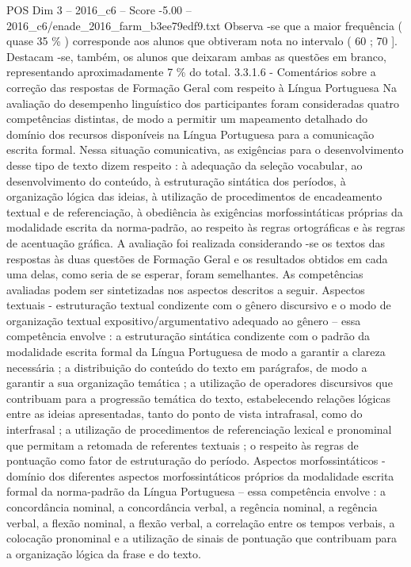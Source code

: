 \begin{textsample}{POS Dim 3 – 2016\_c6 – Score -5.00 – 2016\_c6/enade\_2016\_farm\_b3ee79edf9.txt}
Observa -se que a maior frequência ( quase 35 \% ) corresponde aos alunos que obtiveram nota no intervalo ( 60 ; 70 ].
Destacam -se, também, os alunos que deixaram ambas as questões em branco, representando aproximadamente 7 \% do total. 3.3.1.6 - Comentários sobre a correção das respostas de Formação Geral com respeito à Língua Portuguesa Na avaliação do desempenho linguístico dos participantes foram consideradas quatro competências distintas, de modo a permitir um mapeamento detalhado do domínio dos recursos disponíveis na Língua Portuguesa para a comunicação escrita formal.
Nessa situação comunicativa, as exigências para o desenvolvimento desse tipo de texto dizem respeito : à adequação da seleção vocabular, ao desenvolvimento do conteúdo, à estruturação sintática dos períodos, à organização lógica das ideias, à utilização de procedimentos de encadeamento textual e de referenciação, à obediência às exigências morfossintáticas próprias da modalidade escrita da norma-padrão, ao respeito às regras ortográficas e às regras de acentuação gráfica.
A avaliação foi realizada considerando -se os textos das respostas às duas questões de Formação Geral e os resultados obtidos em cada uma delas, como seria de se esperar, foram semelhantes.
As competências avaliadas podem ser sintetizadas nos aspectos descritos a seguir.
Aspectos textuais - estruturação textual condizente com o gênero discursivo e o modo de organização textual expositivo/argumentativo adequado ao gênero – essa competência envolve : a estruturação sintática condizente com o padrão da modalidade escrita formal da Língua Portuguesa de modo a garantir a clareza necessária ; a distribuição do conteúdo do texto em parágrafos, de modo a garantir a sua organização temática ; a utilização de operadores discursivos que contribuam para a progressão temática do texto, estabelecendo relações lógicas entre as ideias apresentadas, tanto do ponto de vista intrafrasal, como do interfrasal ; a utilização de procedimentos de referenciação lexical e pronominal que permitam a retomada de referentes textuais ; o respeito às regras de pontuação como fator de estruturação do período.
Aspectos morfossintáticos - domínio dos diferentes aspectos morfossintáticos próprios da modalidade escrita formal da norma-padrão da Língua Portuguesa – essa competência envolve : a concordância nominal, a concordância verbal, a regência nominal, a regência verbal, a flexão nominal, a flexão verbal, a correlação entre os tempos verbais, a colocação pronominal e a utilização de sinais de pontuação que contribuam para a organização lógica da frase e do texto.

\end{textsample}
